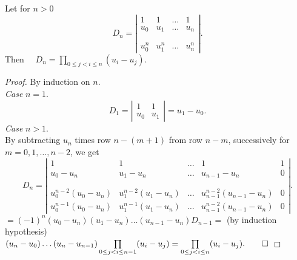 \begin{lemma}[Vandermonde]\label{lemVand}
Let for $n>0$ 
$$D_n =
\left|
\begin{array}{llll}
1 &1 &\ldots &1 \\
u_0 &u_1 &\ldots &u_n \\
&&& \\
&&& \\
u_0^n &u_1^n &\ldots &u_n^n
\end{array}
\right|.$$
Then $\quad D_n = \prod\limits_{0\leq j < i\leq n}(u_i - u_j).$
\end{lemma}
\begin{proof}
By induction on $n.$\\[1ex]
{\em Case }$n=1.$\\
$$D_1 = \left|\begin{array}{ll}
1 &1 \\
u_0 &u_1
\end{array}\right|
= u_1 - u_0.$$
{\em Case }$n>1.$\\
By subtracting $u_n$ times 
row $n-(m+1)$ from row  $n-m$, successively for $m = 0,1,\ldots ,n-2$,
we get 
$$D_n =
\left|
\begin{array}{lllll}
1 &1 &\ldots &1 &1\\
u_0 - u_n &u_1 - u_n &\ldots &u_{n-1} - u_n &0\\
&&& \\
&&& \\
u_0^{n-2}(u_0-u_n) &u_1^{n-2}(u_1-u_n) &\ldots
&u_{n-1}^{n-2}(u_{n-1}-u_n) &0\\
u_0^{n-1}(u_0-u_n) &u_1^{n-1}(u_1-u_n) &\ldots
&u_{n-1}^{n-2}(u_{n-1}-u_n) &0
\end{array}
\right|.$$
$ = (-1)^n(u_0-u_n)(u_1-u_n)\ldots(u_{n-1}-u_n)D_{n-1} =$ (by induction
hypothesis)\\ 
$(u_n-u_0)\ldots(u_n-u_{n-1})
\prod\limits_{0\leq j < i\leq n-1}(u_i - u_j) =  
\prod\limits_{0\leq j < i\leq n}(u_i - u_j).\hfill\qed$ 
\end{proof}

